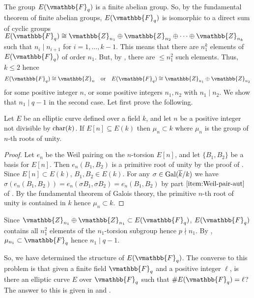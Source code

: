 The group $E(\vmathbb{F}_q)$ is a finite abelian group. So, by the fundamental theorem of finite 
abelian groups, $E(\vmathbb{F}_q)$ is isomorphic to a direct sum of cyclic groups $E(\vmathbb{F}_q) 
\cong \vmathbb{Z}_{n_1} \oplus \vmathbb{Z}_{n_2} \oplus \cdots \oplus \vmathbb{Z}_{n_k}$ such that $n_i 
\mid n_{i + 1}$ for $i = 1, \dots, k - 1$. This means that there are $n_1^k$ elements of 
$E(\vmathbb{F}_q)$ of order $n_1$. But, by , there are $\le 
n_1^2$ such elements. Thus, $k \le 2$ hence
$$
E(\vmathbb{F}_q) \cong \vmathbb{Z}_{n}  \quad \text{or} \quad E(\vmathbb{F}_q) \cong \vmathbb{Z}_{n_1} 
\oplus \vmathbb{Z}_{n_2}
$$
for some positive integer $n$, or some positive integers $n_1, n_2$ with $n_1 \mid n_2$.  We show 
that $n_1 \mid q - 1$ in the second case. Let first prove the following.
\begin{lemma}
\label{lemma:fq-structure-mu}
Let $E$ be an elliptic curve defined over a field $k$, and let $n$ be a positive integer not 
divisible by $\operatorname{char}(k)$. If $E[n] \subseteq E(k)$ then $\mu_n \subset k$ where $\mu_n$ is the 
group of $n$-th roots of unity.
\end{lemma}
\begin{proof}
Let $e_n$ be the Weil pairing on the $n$-torsion $E[n]$, and let $\{B_1, B_2\}$ be a basis for 
$E[n]$. Then $e_n(B_1, B_2)$ is a primitive root of unity by the proof of 
. Since $E[n] \subset E(k)$, $B_1, B_2 \in E(k)$. For any $\sigma 
\in \operatorname{Gal}(\overline{k} / k)$ we have $\sigma(e_n(B_1, B_2)) = e_n(\sigma B_1, \sigma B_2) = e_n(B_1, 
B_2)$ by part $\ref{item:Weil-pair-aut}$ of . By the fundamental 
theorem of Galois theory, the primitive $n$-th root of unity is contained in $k$ hence $\mu_n 
\subset k$.
\end{proof}
Since $\vmathbb{Z}_{n_1} \oplus \vmathbb{Z}_{n_1} \subset E(\vmathbb{F}_q)$, $E(\vmathbb{F}_q)$ contains 
all $n_1^2$ elements of the $n_1$-torsion subgroup hence $p \nmid n_1$. By 
, $\mu_{n_1} \subset \vmathbb{F}_q$ hence $n_1 \mid q - 1$.

So, we have determined the structure of $E(\vmathbb{F}_q)$. The converse to this problem is that 
given a finite field $\vmathbb{F}_q$ and a positive integer $\ell$, is there an elliptic curve $E$ 
over $\vmathbb{F}_q$ such that $\#E(\vmathbb{F}_q) = \ell$? The answer to this is given in 
\cite{Ruck1987} and \cite{Waterhouse1969}.











